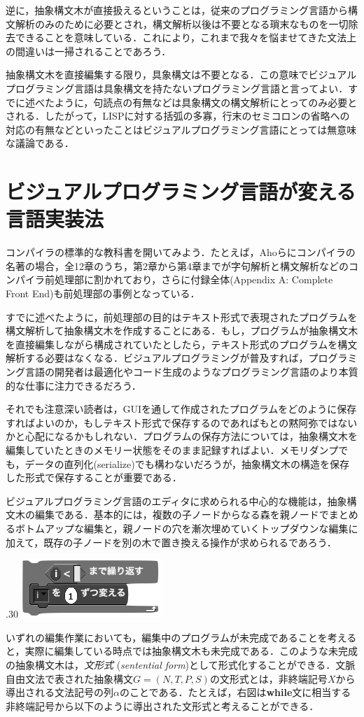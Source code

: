 \documentclass [11pt] {jsarticle}
\newcommand\Section[1]{\newpage \section {#1}}
\newcommand\rsv[1]{\textrm {\textbf {#1}}}
\begin{document}
逆に，抽象構文木が直接扱えるということは，従来のプログラミング言語から構文解析のみのために必要とされ，構文解析以後は不要となる瑣末なものを一切除去できることを意味している．これにより，これまで我々を悩ませてきた文法上の間違いは一掃されることであろう．

抽象構文木を直接編集する限り，具象構文は不要となる．この意味でビジュアルプログラミング言語は具象構文を持たないプログラミング言語と言ってよい．すでに述べたように，句読点の有無などは具象構文の構文解析にとってのみ必要とされる．したがって，LISPに対する括弧の多寡，行末のセミコロンの省略への対応の有無などといったことはビジュアルプログラミング言語にとっては無意味な議論である．


\Section {ビジュアルプログラミング言語が変える言語実装法}

コンパイラの標準的な教科書を開いてみよう．たとえば，Ahoらにコンパイラの名著の場合\cite {Aho06Compilers:-Principles-techniques}，全12章のうち，第2章から第4章までが字句解析と構文解析などのコンパイラ前処理部に割かれており，さらに付録全体(Appendix A: Complete Front End)も前処理部の事例となっている．

すでに述べたように，前処理部の目的はテキスト形式で表現されたプログラムを構文解析して抽象構文木を作成することにある．もし，プログラムが抽象構文木を直接編集しながら構成されていたとしたら，テキスト形式のプログラムを構文解析する必要はなくなる．ビジュアルプログラミングが普及すれば，プログラミング言語の開発者は最適化やコード生成のようなプログラミング言語のより本質的な仕事に注力できるだろう．

それでも注意深い読者は，GUIを通して作成されたプログラムをどのように保存すればよいのか，もしテキスト形式で保存するのであればもとの黙阿弥ではないかと心配になるかもしれない．プログラムの保存方法については，抽象構文木を編集していたときのメモリー状態をそのまま記録すればよい．メモリダンプでも，データの直列化(serialize)でも構わないだろうが，抽象構文木の構造を保存した形式で保存することが重要である．

ビジュアルプログラミング言語のエディタに求められる中心的な機能は，抽象構文木の編集である．基本的には，複数の子ノードからなる森を親ノードでまとめるボトムアップな編集と，親ノードの穴を漸次埋めていくトップダウンな編集に加えて，既存の子ノードを別の木で置き換える操作が求められるであろう．\cite {sasaki10GUI-component-visual}

\begin {floatingfigure}[r]{.30\linewidth}
\includegraphics [width=.25\linewidth] {figs/scratch-sentential.png}
\end {floatingfigure}
いずれの編集作業においても，編集中のプログラムが未完成であることを考えると，実際に編集している時点では抽象構文木も未完成である．このような未完成の抽象構文木は，\emph {文形式} (\emph {sentential form})として形式化することができる．文脈自由文法で表された抽象構文$G = (N, T, P, S)$の文形式とは，非終端記号$X$から導出される文法記号の列$\alpha$のことである．たとえば，右図は\rsv {while}文に相当する非終端記号から以下のように導出された文形式と考えることができる．
\end{document}

